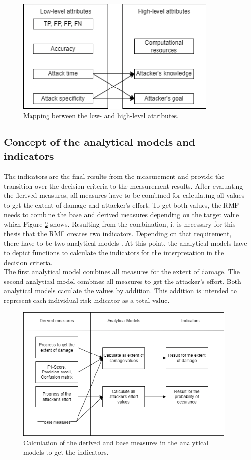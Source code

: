 \begin{figure}[ht!]
  \centering
  \includegraphics[width=10cm]{pictures/attribute_mapping.png}
  \caption{Mapping between the low- and high-level attributes.}
  \label{fig:attribute_mapping}
\end{figure}

\subsection{Concept of the analytical models and indicators}

The indicators are the final results from the measurement and provide the transition over the decision criteria to the measurement results. After evaluating the derived measures, all measures have to be combined for calculating all values to get the extent of damage and attacker's effort. To get both values, the RMF needs to combine the base and derived measures depending on the target value which Figure \ref{fig:indicators} shows. Resulting from the combination, it is necessary for this thesis that the RMF creates two indicators. Depending on that requirement, there have to be two analytical models \cite{ISO_27004_2009}. At this point, the analytical models have to depict functions to calculate the indicators for the interpretation in the decision criteria. \\ The first analytical model combines all measures for the extent of damage. The second analytical model combines all measures to get the attacker's effort. Both analytical models caculate the values by addition. This addition is intended to represent each individual risk indicator as a total value.

\begin{figure}[ht!]
  \centering
  \includegraphics[width=11cm]{pictures/indicators.png}
  \caption{Calculation of the derived and base measures in the analytical models to get the indicators.}
  \label{fig:indicators}
\end{figure}

